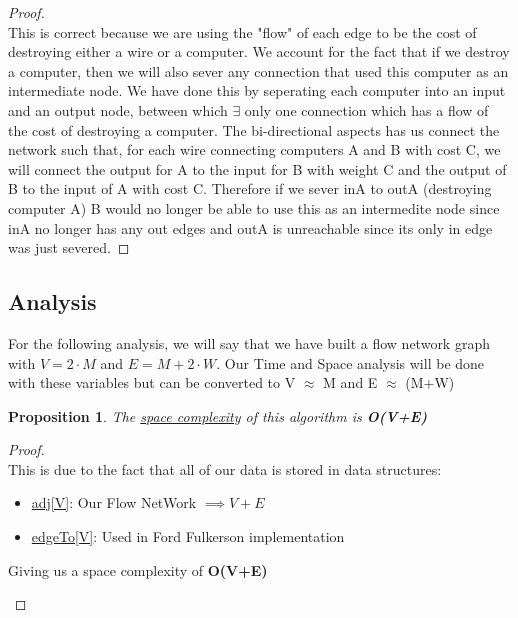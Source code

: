 \documentclass[12pt]{article}
\newtheorem{proposition}[theorem]{Proposition}
\begin{document}
\begin{proof}
~ \\ \indent This is correct because we are using the "flow" of each edge to be the cost of
destroying either a wire or a computer. We account for the fact that if we destroy
a computer, then we will also sever any connection that used this computer as an
intermediate node. We have done this by seperating each computer into an input and
an output node, between which $\exists$ only one connection which has a flow of the cost of
destroying a computer. The bi-directional aspects has us connect the network such
that, for each wire connecting computers A and B with cost C, we will connect the
output for A to the input for B with weight C and the output of B to the input of A
with cost C. Therefore if we sever inA to outA (destroying computer A) B would
no longer be able to use this as an intermedite node since inA no longer has any out
edges and outA is unreachable since its only in edge was just severed.
\end{proof}

\subsection{Analysis}
For the following analysis, we will say that we have built a flow network graph with
$V = 2\cdot M$ and $E = M + 2\cdot W$. Our Time and Space analysis will be done with these
variables but can be converted to V $\approx$ M and E $\approx$ (M+W)

\begin{proposition}
\label{numq}
The \underline{space complexity} of this algorithm is \textbf{O(V+E)}
\end{proposition}

\begin{proof}
~ \\ \indent This is due to the fact that all of our data is stored in data structures:
\begin{itemize}
    \item \underline{adj[V]}: Our Flow NetWork $\implies V+E$
    \item \underline{edgeTo[V]}: Used in Ford Fulkerson implementation
\end{itemize}
\begin{center}
    Giving us a space complexity of \textbf{O(V+E)}
\end{center}
\end{proof}
\end{document}
